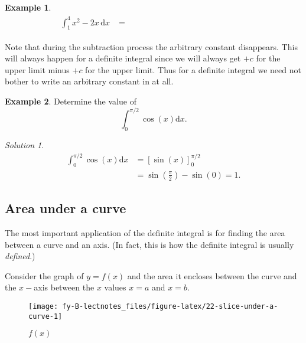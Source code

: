 \documentclass[
  english,
  11pt,
  oneside]{book}
\newcommand{\slide}{}
\theoremstyle{definition}
\theoremstyle{definition}
\newtheorem{example}{Example}[chapter]
\theoremstyle{definition}
\theoremstyle{definition}
\theoremstyle{remark}
\newtheorem*{solution}{Solution}
\begin{document}
\begin{slidesonly}

\slide

\begin{example}
\begin{align*}
\int_1^4 x^2-2x\,\mathrm{d}x& = \phantom{\left(\frac{4^3}{3}-4^2+C\right) - \left(\frac{1^3}{3}-1^2+C\right)}
\end{align*}
\end{example}

\vfill

\slide

\end{slidesonly}

Note that during the subtraction process the arbitrary constant disappears. This will always happen for a definite integral since we will always get \(+ c\) for the upper limit minus \(+ c\) for the upper limit. Thus for a definite integral we need not bother to write an arbitrary constant in at all.
\slide

\begin{example}
Determine the value of
\[
\int_0^{\pi/2}\cos(x)\mathrm{d}x.
\]
\end{example}

\begin{solution}
\begin{align*}
\int_0^{\pi/2}\cos(x)\mathrm{d}x& = \left[\sin(x)\right]_0^{\pi/2}\\
&=\sin\left(\frac{\pi}{2}\right)-\sin(0) = 1.
\end{align*}
\end{solution}

\slide

\subsection{Area under a curve}\label{area-under-a-curve}

The most important application of the definite integral is for finding the area between a curve and an axis. (In fact, this is how the definite integral is usually \emph{defined}.)

Consider the graph of \(y = f(x)\) and the area it encloses between the curve and the \(x-\)axis between the \(x\) values \(x = a\) and \(x = b\).

\begin{figure}

{\centering \texttt{[image: fy-B-lectnotes\_files/figure-latex/22-slice-under-a-curve-1]} 

}

\caption{$f(x)$}\label{fig:22-slice-under-a-curve}
\end{figure}
\end{document}
